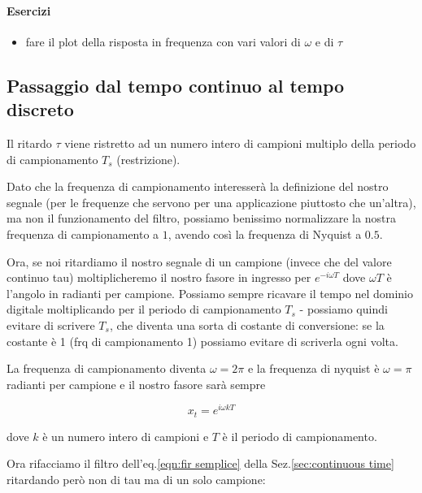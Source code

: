 \paragraph{Esercizi}

\begin{itemize}

  \item fare il plot della risposta in frequenza con vari valori di $\omega$ e
          di $\tau$

\end{itemize}


\subsection{Passaggio dal tempo continuo al tempo discreto}


  Il ritardo $\tau$ viene ristretto ad un numero intero di campioni multiplo della
    periodo di campionamento $T_s$ (restrizione).

  Dato che la frequenza di campionamento interesser\`a  la  definizione
    del  nostro  segnale  (per  le  frequenze  che   servono   per   una
    applicazione piuttosto che un'altra), ma non  il  funzionamento  del
    filtro, possiamo  benissimo  normalizzare  la  nostra  frequenza  di
    campionamento a $1$, avendo cos\`i la frequenza di Nyquist a $0.5$.

  Ora, se noi ritardiamo il nostro segnale di un campione (invece che del
    valore continuo tau) moltiplicheremo il nostro fasore in ingresso per
    $e^{-i \omega T}$ dove $\omega T$ \`e l'angolo in radianti per campione. Possiamo sempre
    ricavare il tempo nel dominio digitale moltiplicando per il periodo di
    campionamento $T_s$ - possiamo quindi evitare di scrivere $T_s$, che diventa
    una sorta di costante di conversione: se la costante \`e 1 (frq di
    campionamento 1) possiamo evitare di scriverla ogni volta.

  La frequenza di campionamento diventa $\omega = 2 \pi$ e la frequenza di nyquist \`e
    $\omega = \pi$ radianti per campione e il nostro fasore sar\`a sempre

     \begin{equation}
        x_t = e^{i\omega kT}
     \end{equation}
    
    dove $k$ \`e un numero intero di campioni e $T$ \`e il periodo di campionamento.

    Ora rifacciamo il filtro dell'eq.\ref{eqn:fir semplice} della Sez.\vref{sec:continuous time} ritardando per\`o non di tau
    ma di un solo campione:

